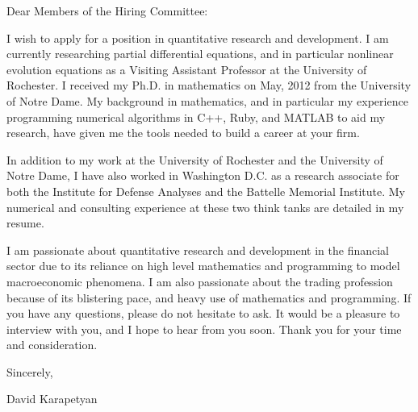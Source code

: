 Dear Members of the Hiring Committee:

I wish to apply for a position in quantitative research and development. I am currently researching partial differential equations, and in particular nonlinear evolution equations as a Visiting Assistant Professor at the University of Rochester. I received my Ph.D. in mathematics on May, 2012 from the University of Notre Dame. My
background in mathematics, and in particular my experience
programming numerical algorithms in C++, Ruby, and MATLAB
to aid my research, have given me the tools needed to build a career at your firm.

In addition to my work at the University of Rochester and the University of Notre Dame, I have also worked in Washington D.C. as a research
associate for both the Institute for Defense Analyses and the Battelle Memorial
Institute. My numerical and consulting experience at these two think tanks are
detailed in my resume. 

I am passionate about quantitative research and development in the financial sector due to its reliance on high level mathematics and programming to model macroeconomic phenomena. I am also passionate about the trading profession because of its blistering pace, and heavy use of mathematics and programming. 
If you have any questions, please do not hesitate to ask. It would be a
pleasure to interview with you, and I hope to hear from you soon. Thank you for
your time and consideration. 

Sincerely,

David Karapetyan

